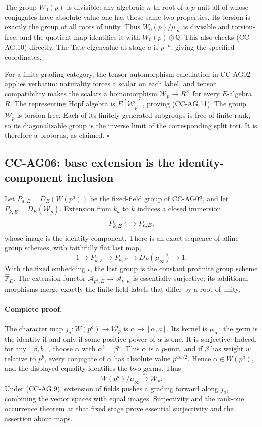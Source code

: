 \documentclass[11pt,a4paper]{article}
\theoremstyle{definition}\newtheorem{definition}[theorem]{Definition}
\theoremstyle{remark}\newtheorem{remark}[theorem]{Remark}
\begin{document}
The group \(W_0(p)\) is divisible: any algebraic \(n\)-th root
of a \(p\)-unit all of whose conjugates have absolute value one
has those same two properties. Its torsion is exactly the group
of all roots of unity. Thus \(W_0(p)/\mu_\infty\) is divisible
and torsion-free, and the quotient map identifies it with
\(W_0(p)\otimes\mathbb Q\). This also checks (CC-AG.10) directly.
The Tate eigenvalue at stage \(a\) is \(p^{-a}\), giving the
specified coordinates.

For a finite grading category, the tensor automorphism calculation
in CC-AG02 applies verbatim: naturality forces a scalar on each
label, and tensor compatibility makes the scalars a homomorphism
\(\mathcal W_p\to R^\times\) for every \(E\)-algebra \(R\).
The representing Hopf algebra is \(E[\mathcal W_p]\), proving
(CC-AG.11). The group \(\mathcal W_p\) is torsion-free. Each of
its finitely generated subgroups is free of finite rank, so its
diagonalizable group is the inverse limit of the corresponding
split tori. It is therefore a protorus, as claimed. \(\square\)

\subsection{CC-AG06: base extension is the identity-component inclusion}

Let \(P_{a,E}=D_E(W(p^a))\) be the fixed-field group of CC-AG02,
and let \(P_{\bar k,E}=D_E(\mathcal W_p)\). Extension from \(k_a\)
to \(\bar k\) induces a closed immersion
\[
 P_{\bar k,E}\lhook\joinrel\longrightarrow P_{a,E},
\]
whose image is the identity component. There is an exact sequence
of affine group schemes, with faithfully flat last map,
\[
 1\longrightarrow P_{\bar k,E}\longrightarrow P_{a,E}
 \longrightarrow D_E(\mu_\infty)\longrightarrow1. \tag{CC-AG.12}
\]
With the fixed embedding \(\iota\), the last group is the constant
profinite group scheme \(\widehat{\mathbb Z}_E\). The extension
functor \(\mathcal A_{p^a,E}\to\mathcal A_{\bar k,E}\) is
essentially surjective; its additional morphisms merge exactly the
finite-field labels that differ by a root of unity.

\paragraph{Complete proof.}
The character map \(j_a:W(p^a)\to\mathcal W_p\) is
\(\alpha\mapsto[\alpha,a]\). Its kernel is \(\mu_\infty\):
the germ is the identity if and only if some positive power of
\(\alpha\) is one. It is surjective. Indeed, for any
\([\beta,b]\), choose \(\alpha\) with
\(\alpha^b=\beta^a\). This \(\alpha\) is a \(p\)-unit, and if
\(\beta\) has weight \(w\) relative to \(p^b\), every conjugate
of \(\alpha\) has absolute value \(p^{aw/2}\). Hence
\(\alpha\in W(p^a)\), and the displayed equality identifies
the two germs. Thus
\[
 W(p^a)/\mu_\infty\xrightarrow{\sim}\mathcal W_p. \tag{CC-AG.13}
\]
Under (CC-AG.9), extension of fields pushes a grading forward
along \(j_a\), combining the vector spaces with equal images.
Surjectivity and the rank-one occurrence theorem at that fixed
stage prove essential surjectivity and the assertion about maps.
\end{document}
